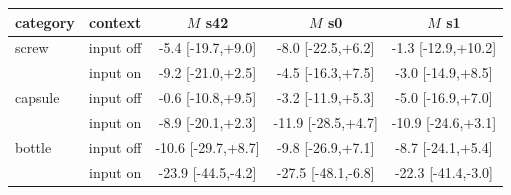 \setlength{\tabcolsep}{3pt}
\begin{tabular}{@{}lcccc@{}}
\toprule
category & context & $M$ s42 & $M$ s0 & $M$ s1 \\
\midrule
screw & input off & -5.4 [-19.7,+9.0] & -8.0 [-22.5,+6.2] & -1.3 [-12.9,+10.2] \\
 & input on & -9.2 [-21.0,+2.5] & -4.5 [-16.3,+7.5] & -3.0 [-14.9,+8.5] \\
capsule & input off & -0.6 [-10.8,+9.5] & -3.2 [-11.9,+5.3] & -5.0 [-16.9,+7.0] \\
 & input on & -8.9 [-20.1,+2.3] & -11.9 [-28.5,+4.7] & -10.9 [-24.6,+3.1] \\
bottle & input off & -10.6 [-29.7,+8.7] & -9.8 [-26.9,+7.1] & -8.7 [-24.1,+5.4] \\
 & input on & -23.9 [-44.5,-4.2] & -27.5 [-48.1,-6.8] & -22.3 [-41.4,-3.0] \\
\bottomrule
\end{tabular}

